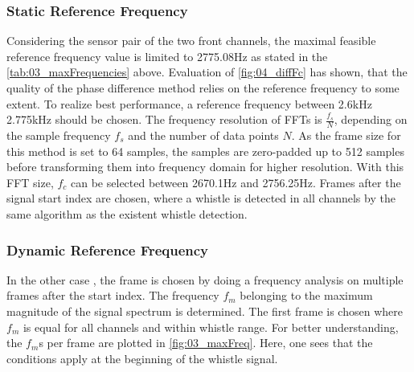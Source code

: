 \subsubsection*{Static Reference Frequency}

Considering the sensor pair of the two front channels, the maximal feasible
reference frequency value is limited to 2775.08\si{\hertz} as stated in the \cref{tab:03_maxFrequencies} above.
Evaluation of \cref{fig:04_diffFc} has shown, that the quality of the phase difference
method relies on the reference frequency to some extent. 
To realize best performance, a reference frequency between 2.6\si{\kilo\hertz} 2.775\si{\kilo\hertz}
should be chosen.
The frequency resolution of \acp{FFT} is $\frac{f_s}{N}$, depending on the sample frequency $f_s$ and
the number of data points $N$.
As the frame size for this method is set to 64 samples, the samples are zero-padded
up to 512 samples before transforming them into frequency domain for higher resolution.
With this \ac{FFT} size, $f_c$ can be selected between 2670.1\si{\hertz} and 2756.25\si{\hertz}.
Frames after the signal start index are chosen, where a whistle is detected
in all channels by the same algorithm as the existent whistle detection.

\subsubsection*{Dynamic Reference Frequency}

In the other case , the frame is chosen by doing a frequency analysis on
multiple frames after the start index.
The frequency $f_m$ belonging to the maximum magnitude of the signal spectrum
is determined.
The first frame is chosen where $f_m$ is equal for all channels and
within whistle range.
For better understanding, the $f_m$s  per frame are plotted in \cref{fig:03_maxFreq}.
Here, one sees that the conditions apply at the beginning of the whistle signal. 


